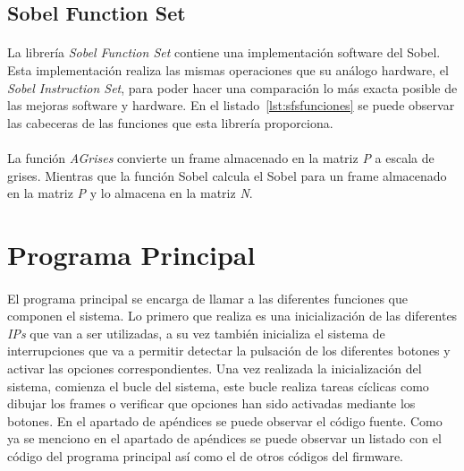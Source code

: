 \documentclass[a4paper,12pt,titlepage,final]{book}
\begin{document}


\subsection{Sobel Function Set}
\paragraph{}
La librería \textit{Sobel Function Set} contiene una implementación software del Sobel. Esta implementación realiza las mismas operaciones que su análogo hardware, el \textit{Sobel Instruction Set}, para poder hacer una comparación lo más exacta posible de las mejoras software y hardware. En el listado~\ref{lst:sfsfunciones} se puede observar las cabeceras de las funciones que esta librería proporciona.



\paragraph{}
La función \textit{AGrises} convierte un frame almacenado en la matriz \textit{P} a escala de grises. Mientras que la función Sobel calcula el Sobel para un frame almacenado en la matriz \textit{P} y lo almacena en la matriz \textit{N}. 


\section{Programa Principal}
\paragraph{}
El programa principal se encarga de llamar a las diferentes funciones que componen el sistema. Lo primero que realiza es una inicialización de las diferentes \textit{IPs} que van a ser utilizadas, a su vez también inicializa el sistema de interrupciones que va a permitir detectar la pulsación de los diferentes botones y activar las opciones correspondientes. Una vez realizada la inicialización del sistema, comienza el bucle del sistema, este bucle realiza tareas cíclicas como dibujar los frames o verificar que opciones han sido activadas mediante los botones. En el apartado de apéndices se puede observar el código fuente. Como ya se menciono en el apartado de apéndices se puede observar un listado con el código del programa principal así como el de otros códigos del firmware.
\end{document}
